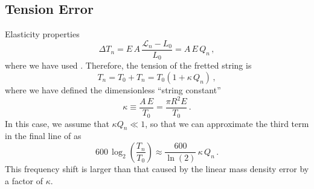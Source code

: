  \subsection{Tension Error\label{sct:model_tension}}
Elasticity properties~\cite{ref:landau1986toe}
 \begin{equation} \label{eqn:youngs_mod_def}
\Delta T_n = E\, A\, \frac{\mathcal{L}_n - L_0}{L_0} = A\, E\, Q_n\, ,
 \end{equation}
where we have used . Therefore, the tension of the fretted string is
 \begin{equation}
T_n = T_0 + T_n = T_0 \left( 1 + \kappa\, Q_n \right)\, ,
 \end{equation}
where we have defined the dimensionless ``string constant''
 \begin{equation}\label{eqn:kappa_def}
\kappa \equiv \frac{A\, E}{T_0} = \frac{\pi R^2 E}{T_0}\, .
 \end{equation}
In this case, we assume that $\kappa Q_n \ll 1$, so that we can approximate the third term in the final line of  as
 \begin{equation}
600\, \log_2 \left(  \frac{T_n}{T_0} \right) \approx \frac{600}{\ln(2)}\, \kappa\, Q_n\, .
 \end{equation}
This frequency shift is larger than that caused by the linear mass density error by a factor of $\kappa$.
